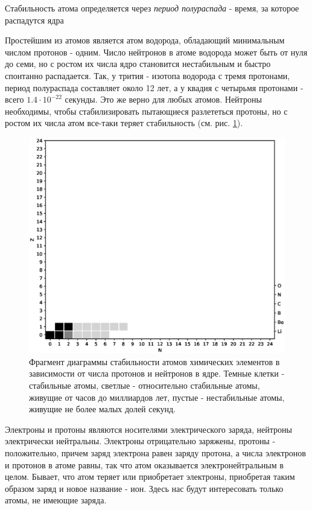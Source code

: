 Стабильность атома определяется через \textit{период полураспада} - время, за которое распадутся ядра 




Простейшим из атомов является атом водорода, обладающий минимальным числом протонов - одним.
Число нейтронов в атоме водорода может быть от нуля до семи, но с ростом их числа ядро становится нестабильным и быстро спонтанно распадается.
Так, у трития - изотопа водорода с тремя протонами, период полураспада составляет около 12 лет, а у квадия с четырьмя протонами - всего $1.4\cdot 10^{−22}$ секунды.
Это же верно для любых атомов.
Нейтроны необходимы, чтобы стабилизировать пытающиеся разлететься протоны, но с ростом их числа атом все-таки теряет стабильность (см. рис. \ref{fig:atom_stability}).


\begin{figure}[t!]
   \centering
   \includegraphics[scale=0.4]{images/atom_stability}
   \caption{Фрагмент диаграммы стабильности атомов химических элементов в зависимости от числа протонов и нейтронов в ядре. Темные клетки - стабильные атомы, светлые - относительно стабильные атомы, живущие от часов до миллиардов лет, пустые - нестабильные атомы, живущие не более малых долей секунд.}
   \label{fig:atom_stability}
\end{figure}




Электроны и протоны являются носителями электрического заряда, нейтроны электрически нейтральны. 
Электроны отрицательно заряжены, протоны - положительно, причем заряд электрона равен заряду протона, а числа электронов и протонов в атоме равны, так что атом оказывается электронейтральным в целом.
Бывает, что атом теряет или приобретает электроны, приобретая таким образом заряд и новое название - ион.
Здесь нас будут интересовать только атомы, не имеющие заряда.

